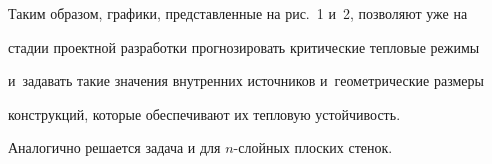 %





%

 



Таким образом, графики, представленные на рис.~1 и~2, позволяют уже на

стадии проектной разработки прогнозировать критические тепловые режимы

и~задавать такие значения внутренних источников и~геометрические размеры

конструкций, которые обеспечивают их тепловую устойчивость.



Аналогично решается задача и для $n$-слойных  плоских стенок.



